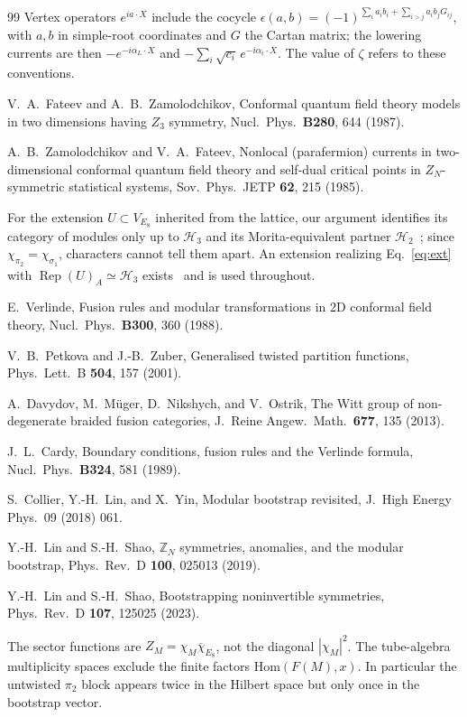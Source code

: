 \documentclass[aps,prl,twocolumn,superscriptaddress,nofootinbib]{revtex4-2}
\newcommand{\cH}{\mathcal H}
\newcommand{\Rep}{\operatorname{Rep}}
\newcommand{\VE}{\overline{\chi}_{E_8}}
\begin{document}
\begin{thebibliography}{99}
Vertex operators $e^{ia\cdot X}$ include the cocycle
$\epsilon(a,b)=(-1)^{\sum_ia_ib_i+\sum_{i>j}a_ib_jG_{ij}}$, with $a,b$
in simple-root coordinates and $G$ the Cartan matrix; the lowering
currents are then $-e^{-i\alpha_L\cdot X}$ and
$-\sum_i\sqrt{c_i}\,e^{-i\alpha_i\cdot X}$. The value of $\zeta$ refers
to these conventions.

V.~A.~Fateev and A.~B.~Zamolodchikov,
Conformal quantum field theory models in two dimensions having $Z_3$
symmetry,
Nucl.\ Phys.\ \textbf{B280}, 644 (1987).

A.~B.~Zamolodchikov and V.~A.~Fateev,
Nonlocal (parafermion) currents in two-dimensional conformal quantum
field theory and self-dual critical points in $Z_N$-symmetric
statistical systems,
Sov.\ Phys.\ JETP \textbf{62}, 215 (1985).

For the extension $U\subset V_{E_8}$ inherited from the lattice, our
argument identifies its category of modules only up to $\cH_3$ and its
Morita-equivalent partner $\cH_2$~\cite{GS,AHKZ}; since
$\chi_{\pi_2}=\chi_{\sigma_1}$, characters cannot tell them apart. An
extension realizing Eq.~\eqref{eq:ext} with $\Rep(U)_A\simeq\cH_3$
exists~\cite{companion} and is used throughout.

E.~Verlinde,
Fusion rules and modular transformations in 2D conformal field theory,
Nucl.\ Phys.\ \textbf{B300}, 360 (1988).

V.~B.~Petkova and J.-B.~Zuber,
Generalised twisted partition functions,
Phys.\ Lett.\ B \textbf{504}, 157 (2001).

A.~Davydov, M.~M\"uger, D.~Nikshych, and V.~Ostrik,
The Witt group of non-degenerate braided fusion categories,
J.\ Reine Angew.\ Math.\ \textbf{677}, 135 (2013).

J.~L.~Cardy,
Boundary conditions, fusion rules and the Verlinde formula,
Nucl.\ Phys.\ \textbf{B324}, 581 (1989).

S.~Collier, Y.-H.~Lin, and X.~Yin,
Modular bootstrap revisited,
J.\ High Energy Phys.\ 09 (2018) 061.

Y.-H.~Lin and S.-H.~Shao,
$\mathbb Z_N$ symmetries, anomalies, and the modular bootstrap,
Phys.\ Rev.\ D \textbf{100}, 025013 (2019).

Y.-H.~Lin and S.-H.~Shao,
Bootstrapping noninvertible symmetries,
Phys.\ Rev.\ D \textbf{107}, 125025 (2023).

The sector functions are $Z_M=\chi_M\VE$, not the diagonal $|\chi_M|^2$.
The tube-algebra multiplicity spaces exclude the finite factors
$\mathrm{Hom}(F(M),x)$. In particular the untwisted $\pi_2$ block
appears twice in the Hilbert space but only once in the bootstrap
vector.


\end{thebibliography}
\end{document}
